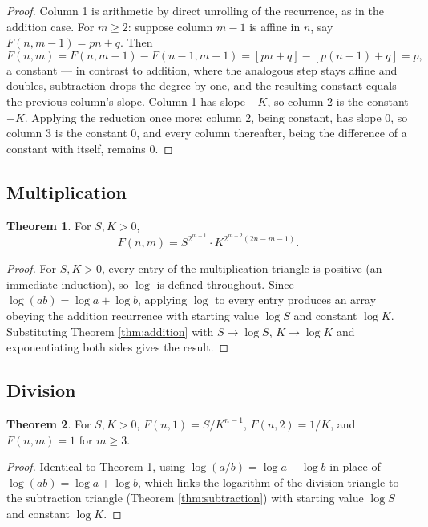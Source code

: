 \documentclass[11pt]{article}
\theoremstyle{definition}
\newtheorem{theorem}{Theorem}[section]
\begin{document}
\begin{proof}
Column 1 is arithmetic by direct unrolling of the recurrence, as in the addition case. For $m\ge2$: suppose column $m-1$ is affine in $n$, say $F(n,m-1) = pn+q$. Then
\[
F(n,m) = F(n,m-1)-F(n-1,m-1) = [pn+q]-[p(n-1)+q] = p,
\]
a constant --- in contrast to addition, where the analogous step stays affine and doubles, subtraction drops the degree by one, and the resulting constant equals the previous column's slope. Column 1 has slope $-K$, so column 2 is the constant $-K$. Applying the reduction once more: column 2, being constant, has slope $0$, so column 3 is the constant $0$, and every column thereafter, being the difference of a constant with itself, remains $0$.
\end{proof}

\subsection{Multiplication}

\begin{theorem}\label{thm:multiplication}
For $S,K>0$,
\[
F(n,m) = S^{2^{m-1}} \cdot K^{2^{m-2}(2n-m-1)}.
\]
\end{theorem}

\begin{proof}
For $S,K>0$, every entry of the multiplication triangle is positive (an immediate induction), so $\log$ is defined throughout. Since $\log(ab)=\log a+\log b$, applying $\log$ to every entry produces an array obeying the addition recurrence with starting value $\log S$ and constant $\log K$. Substituting Theorem \ref{thm:addition} with $S\to\log S$, $K\to\log K$ and exponentiating both sides gives the result.
\end{proof}

\subsection{Division}

\begin{theorem}\label{thm:division}
For $S,K>0$, $F(n,1) = S/K^{n-1}$, $F(n,2) = 1/K$, and $F(n,m)=1$ for $m\ge3$.
\end{theorem}

\begin{proof}
Identical to Theorem \ref{thm:multiplication}, using $\log(a/b)=\log a-\log b$ in place of $\log(ab)=\log a+\log b$, which links the logarithm of the division triangle to the subtraction triangle (Theorem \ref{thm:subtraction}) with starting value $\log S$ and constant $\log K$.
\end{proof}
\end{document}

